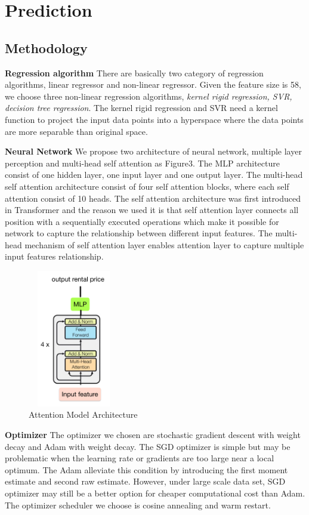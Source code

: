 \documentclass[final]{cvpr}
\begin{document}
\section{Prediction}
\subsection{Methodology}

\textbf{Regression algorithm}
There are basically two category of regression algorithms, linear regressor and non-linear regressor. Given the feature size is 58, we choose three non-linear regression algorithms, \textit{kernel rigid regression, SVR, decision tree regression}. The kernel rigid regression and SVR need a kernel function to project the input data points into a hyperspace where the data points are more separable than original space.

\textbf{Neural Network}
We propose two architecture of neural network, multiple layer perception and multi-head self attention as Figure3. The MLP architecture consist of one hidden layer, one input layer and one output layer. The multi-head self attention architecture consist of four self attention blocks, where each self attention consist of 10 heads. The self attention architecture was first introduced in Transformer\cite{ref4} and the reason we used it is that self attention layer connects all position with a sequentially executed operations which make it possible for network to capture the relationship between different input features. The multi-head mechanism of self attention layer enables attention layer to capture multiple input features relationship.

\begin{figure}[h]
\centering
\includegraphics[width=4cm,height=6cm]{p4.jpeg}
\caption{Attention Model Architecture}
\end{figure}

\textbf{Optimizer}
The optimizer we chosen are stochastic gradient descent with weight decay and Adam with weight decay\cite{ref6}. The SGD optimizer is simple but may be problematic when the learning rate or gradients are too large near a local optimum. The Adam alleviate this condition by introducing the first moment estimate and second raw estimate. However, under large scale data set, SGD optimizer may still be a better option for cheaper computational cost than Adam. The optimizer scheduler we choose is cosine annealing and warm restart\cite{ref7}.
\end{document}
